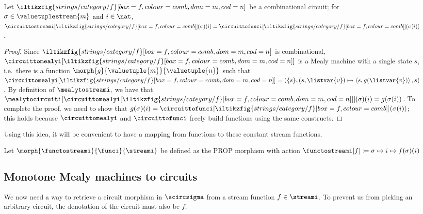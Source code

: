 \begin{lemma}\label{lem:sequential-combinational-semantics}
    Let \(\iltikzfig{strings/category/f}[box=f,colour=comb,dom=m,cod=n]\) be
    a combinational circuit; for \(\sigma \in \valuetuplestream{m}\) and
    \(i \in \nat\), \(
    \circuittostreami[\iltikzfig{strings/category/f}[box=f,colour=comb]](\sigma)(i)
    =
    \circuittofunci[\iltikzfig{strings/category/f}[box=f,colour=comb]](\sigma(i))
    \).
\end{lemma}
\begin{proof}
    Since \(\iltikzfig{strings/category/f}[box=f,colour=comb,dom=m,cod=n]\) is
    combinational, \(
    \circuittomealyi[
        \iltikzfig{strings/category/f}[box=f,colour=comb,dom=m,cod=n]
    ]
    \) is a Mealy machine with a single state \(s\), i.e.\ there is a function
    \(\morph{g}{\valuetuple{m}}{\valuetuple{n}}\) such that  \(
    \circuittomealyi[
        \iltikzfig{strings/category/f}[box=f,colour=comb,dom=m,cod=n]
    ] = (
    \{s\},
    (s, \listvar{v}) \mapsto \left\langle{s, g(\listvar{v})}\right\rangle,
    s
    )\).
    By definition of \(\mealytostreami\), we have that \(\mealytocircuiti[
        \circuittomealyi[
            \iltikzfig{strings/category/f}[box=f,colour=comb,dom=m,cod=n]
        ]
    ](\sigma)(i) = g(\sigma(i))\).
    To complete the proof, we need to show that \(
    g(\sigma)(i) =
    \circuittofunci[\iltikzfig{strings/category/f}[box=f,colour=comb]](\sigma(i))
    \); this holds because \(\circuittomealyi\) and \(\circuittofunci\) freely
    build functions using the same constructs.
\end{proof}

Using this idea, it will be convenient to have a mapping from functions to
these constant stream functions.

\begin{definition}
    Let \(\morph{\functostreami}{\funci}{\streami}\) be defined as the PROP
    morphism with action \(
    \functostreami[f] \coloneqq \sigma \mapsto i \mapsto f(\sigma)(i)
    \)
\end{definition}

\subsection{Monotone Mealy machines to circuits}

We now need a way to retrieve a circuit morphism in \(\scircsigma\) from a
stream function \(f \in \streami\).
To prevent us from picking an arbitrary circuit, the denotation of the circuit
must also be \(f\).


